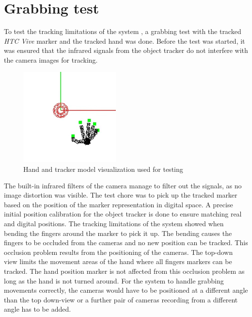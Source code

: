 \section{Grabbing test}
To test the tracking limitations of the system , a grabbing test with the tracked \textit{HTC Vive} marker and the tracked hand was done.
Before the test was started, it was ensured that the infrared signals from the object tracker do not interfere with the camera images for tracking. 
\begin{figure}[H]
\centering
\includegraphics[width=0.45\textwidth]{images/Hand_rendering_view.png}
\caption{Hand and tracker model visualization used for testing}
\label{img:hand_rendering}
\end{figure}
The built-in infrared filters of the camera manage to filter out the signals, as no image distortion was visible. The test chore was to pick up the tracked marker based on the position of the marker representation in digital space.
A precise initial position calibration for the object tracker is done to ensure matching real and digital positions. The tracking limitations of the system showed when bending the fingers around the marker to pick it up. The bending causes the fingers to be occluded from the cameras and no new position can be tracked. This occlusion problem results from the positioning of the cameras. The top-down view limits the movement areas of the hand where all fingers markers can be tracked. The hand position marker is not affected from this occlusion problem as long as the hand is not turned around.
For the system to handle grabbing movements correctly, the cameras would have to be positioned at a different angle than the top down-view or a further pair of cameras recording from a different angle has to be added.
